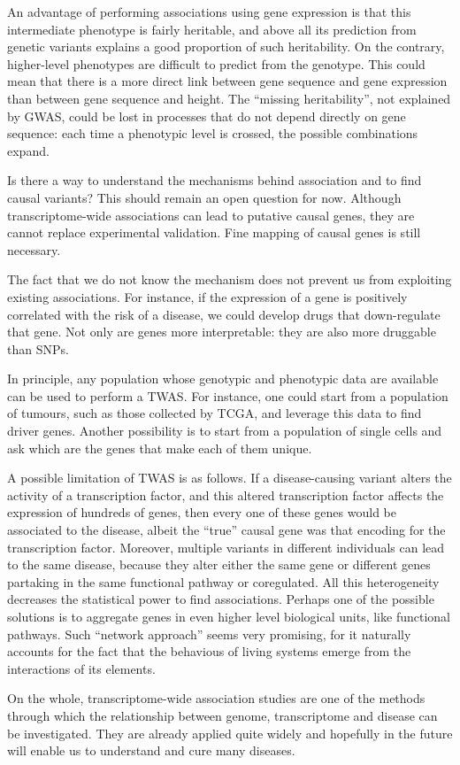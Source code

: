 \documentclass[../main.tex]{subfiles}
\begin{document}
An advantage of performing associations using gene expression is that 
this intermediate phenotype is fairly heritable, and above all its 
prediction from genetic variants explains a good proportion of such 
heritability. On the contrary, higher-level phenotypes are difficult to 
predict from the genotype. This could mean that there is a more direct 
link between gene sequence and gene expression than between gene 
sequence and height. The \enquote{missing heritability}, not explained 
by GWAS, could be lost in processes that do not depend directly on gene 
sequence: each time a phenotypic level is crossed, the possible 
combinations expand.

Is there a way to understand the mechanisms behind association and to 
find causal variants? This should remain an open question for now. 
Although transcriptome-wide associations can lead to putative causal 
genes, they are cannot replace experimental validation. Fine mapping of 
causal genes is still necessary.

The fact that we do not know the mechanism does not prevent us from 
exploiting existing associations. For instance, if the expression of a 
gene is positively correlated with the risk of a disease, we could 
develop drugs that down-regulate that gene. Not only are genes more 
interpretable: they are also more druggable than SNPs.

In principle, any population whose genotypic and phenotypic data are 
available can be used to perform a TWAS. For instance, one could start 
from a population of tumours, such as those collected by TCGA, and 
leverage this data to find driver genes. Another possibility is to start 
from a population of single cells and ask which are the genes that make 
each of them unique.

A possible limitation of TWAS is as follows. If a disease-causing 
variant alters the activity of a transcription factor, and this altered 
transcription factor affects the expression of hundreds of genes, then 
every one of these genes would be associated to the disease, albeit the 
\enquote{true} causal gene was that encoding for the transcription 
factor. Moreover, multiple variants in different individuals can lead to 
the same disease, because they alter either the same gene or different 
genes partaking in the same functional pathway or coregulated. All this 
heterogeneity decreases the statistical power to find associations. 
Perhaps one of the possible solutions is to aggregate genes in even 
higher level biological units, like functional pathways. Such 
\enquote{network approach} seems very promising, for it naturally 
accounts for the fact that the behavious of living systems emerge from 
the interactions of its elements.

On the whole, transcriptome-wide association studies are one of the 
methods through which the relationship between genome, transcriptome and 
disease can be investigated. They are already applied quite widely and 
hopefully in the future will enable us to understand and cure many 
diseases.
\end{document}

